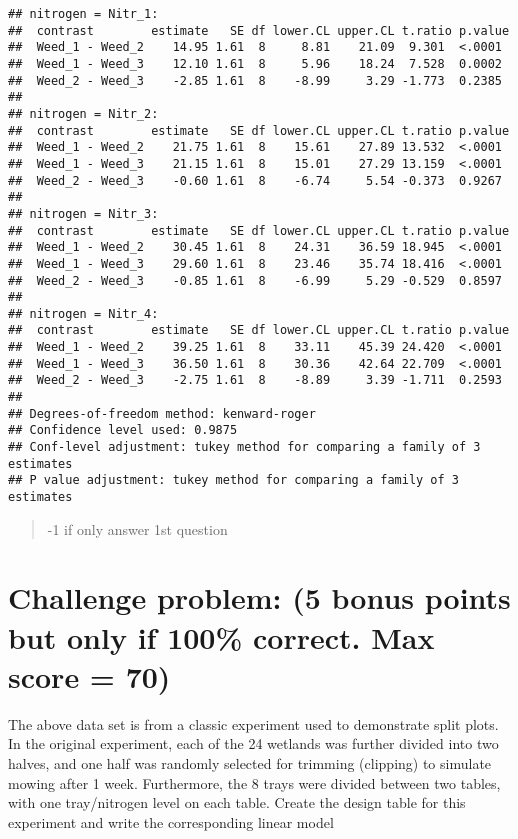 \documentclass[
]{article}
\begin{document}
\begin{verbatim}
## nitrogen = Nitr_1:
##  contrast        estimate   SE df lower.CL upper.CL t.ratio p.value
##  Weed_1 - Weed_2    14.95 1.61  8     8.81    21.09  9.301  <.0001 
##  Weed_1 - Weed_3    12.10 1.61  8     5.96    18.24  7.528  0.0002 
##  Weed_2 - Weed_3    -2.85 1.61  8    -8.99     3.29 -1.773  0.2385 
## 
## nitrogen = Nitr_2:
##  contrast        estimate   SE df lower.CL upper.CL t.ratio p.value
##  Weed_1 - Weed_2    21.75 1.61  8    15.61    27.89 13.532  <.0001 
##  Weed_1 - Weed_3    21.15 1.61  8    15.01    27.29 13.159  <.0001 
##  Weed_2 - Weed_3    -0.60 1.61  8    -6.74     5.54 -0.373  0.9267 
## 
## nitrogen = Nitr_3:
##  contrast        estimate   SE df lower.CL upper.CL t.ratio p.value
##  Weed_1 - Weed_2    30.45 1.61  8    24.31    36.59 18.945  <.0001 
##  Weed_1 - Weed_3    29.60 1.61  8    23.46    35.74 18.416  <.0001 
##  Weed_2 - Weed_3    -0.85 1.61  8    -6.99     5.29 -0.529  0.8597 
## 
## nitrogen = Nitr_4:
##  contrast        estimate   SE df lower.CL upper.CL t.ratio p.value
##  Weed_1 - Weed_2    39.25 1.61  8    33.11    45.39 24.420  <.0001 
##  Weed_1 - Weed_3    36.50 1.61  8    30.36    42.64 22.709  <.0001 
##  Weed_2 - Weed_3    -2.75 1.61  8    -8.89     3.39 -1.711  0.2593 
## 
## Degrees-of-freedom method: kenward-roger 
## Confidence level used: 0.9875 
## Conf-level adjustment: tukey method for comparing a family of 3 estimates 
## P value adjustment: tukey method for comparing a family of 3 estimates
\end{verbatim}

\begin{quote}
-1 if only answer 1st question
\end{quote}

\hypertarget{challenge-problem-5-bonus-points-but-only-if-100-correct.-max-score-70}{%
\section{Challenge problem: (5 bonus points but only if 100\% correct.
Max score =
70)}\label{challenge-problem-5-bonus-points-but-only-if-100-correct.-max-score-70}}

The above data set is from a classic experiment used to demonstrate
split plots. In the original experiment, each of the 24 wetlands was
further divided into two halves, and one half was randomly selected for
trimming (clipping) to simulate mowing after 1 week. Furthermore, the 8
trays were divided between two tables, with one tray/nitrogen level on
each table. Create the design table for this experiment and write the
corresponding linear model
\end{document}
